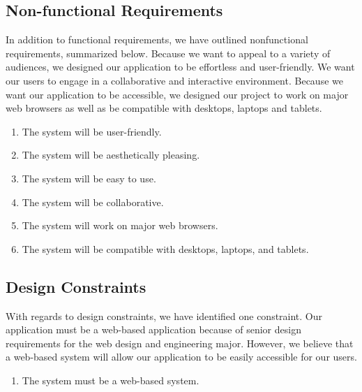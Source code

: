 \subsection{Non-functional Requirements}
In addition to functional requirements, we have outlined nonfunctional requirements, summarized below. Because we want to appeal to a variety of audiences, we designed our application to be effortless and user-friendly. We want our users to engage in a collaborative and interactive environment. Because we want our application to be accessible, we designed our project to work on major web browsers as well as be compatible with desktops, laptops and tablets.
\begin{enumerate}
\item The system will be user-friendly.
\item The system will be aesthetically pleasing.
\item The system will be easy to use.
\item The system will be collaborative.
\item The system will work on major web browsers. 
\item The system will be compatible with desktops, laptops, and tablets. 
\end{enumerate}
\subsection{Design Constraints}
With regards to design constraints, we have identified one constraint. Our application must be a web-based application because of senior design requirements for the web design and engineering major. However, we believe that a web-based system will allow our application to be easily accessible for our users. 
\begin{enumerate}
\item The system must be a web-based system.
\end{enumerate}
